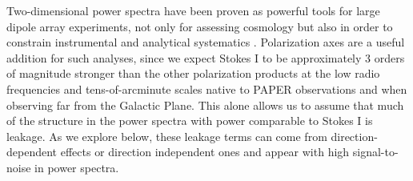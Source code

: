 Two-dimensional power spectra have been proven as powerful tools for large dipole array experiments, not only for assessing cosmology but also in order to constrain instrumental and analytical systematics \citep[e.g.][]{Morales.12}. Polarization axes are a useful addition for such analyses, since we expect Stokes I to be approximately 3 orders of magnitude stronger than the other polarization products at the low radio frequencies and tens-of-arcminute scales native to PAPER observations \citep[e.g.][]{Pen.09, Moore.13} and when observing far from the Galactic Plane. This alone allows us to assume that much of the structure in the power spectra with power comparable to Stokes I is leakage. As we explore below, these leakage terms can come from direction-dependent effects \citep[e.g. wide-field beam leakage;][]{Carozzi.09} or direction independent ones \citep[e.g. Mueller matrix mixing via gain errors and $D$-terms;][]{TMS} and appear with high signal-to-noise in power spectra.

